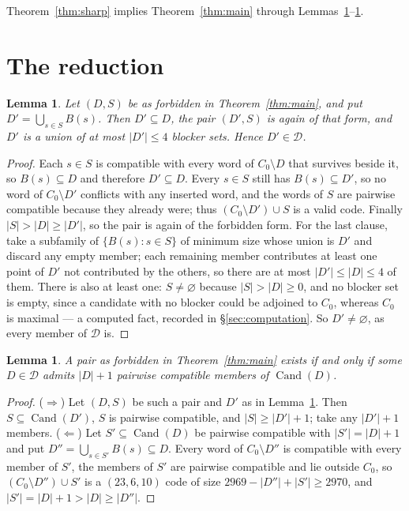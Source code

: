 \documentclass[11pt]{amsart}
\newtheorem{lemma}[theorem]{Lemma}
\theoremstyle{remark}
\DeclareMathOperator{\Cand}{Cand}
\begin{document}
Theorem~\ref{thm:sharp} implies Theorem~\ref{thm:main} through
Lemmas~\ref{lem:shrink}--\ref{lem:iff}.

\section{The reduction}\label{sec:reduction}

\begin{lemma}\label{lem:shrink}
Let $(D,S)$ be as forbidden in Theorem~\ref{thm:main}, and put
$D'=\bigcup_{s\in S}B(s)$. Then $D'\subseteq D$, the pair $(D',S)$ is again of that form, and
$D'$ is a union of at most $|D'|\le 4$ blocker sets. Hence $D'\in\mathcal D$.
\end{lemma}

\begin{proof}
Each $s\in S$ is compatible with every word of $C_0\setminus D$ that survives beside it, so
$B(s)\subseteq D$ and therefore $D'\subseteq D$. Every $s\in S$ still has $B(s)\subseteq D'$,
so no word of $C_0\setminus D'$ conflicts with any inserted word, and the words of $S$ are
pairwise compatible because they already were; thus $(C_0\setminus D')\cup S$ is a valid code.
Finally $|S|>|D|\ge|D'|$, so the pair is again of the forbidden form. For the last clause,
take a subfamily of $\{B(s):s\in S\}$ of minimum size whose union is $D'$ and discard any
empty member; each remaining member contributes at least one point of $D'$ not contributed by
the others, so there are at most $|D'|\le|D|\le4$ of them. There is also at least one: $S\ne\varnothing$
because $|S|>|D|\ge0$, and no blocker set is empty, since a candidate with no blocker could be
adjoined to $C_0$, whereas $C_0$ is maximal --- a computed fact, recorded in
\S\ref{sec:computation}. So $D'\ne\varnothing$, as every member of $\mathcal D$ is.
\end{proof}

\begin{lemma}\label{lem:iff}
A pair as forbidden in Theorem~\ref{thm:main} exists if and only if some $D\in\mathcal D$
admits $|D|+1$ pairwise compatible members of $\Cand(D)$.
\end{lemma}

\begin{proof}
($\Rightarrow$) Let $(D,S)$ be such a pair and $D'$ as in Lemma~\ref{lem:shrink}. Then
$S\subseteq\Cand(D')$, $S$ is pairwise compatible, and $|S|\ge|D'|+1$; take any $|D'|+1$
members. ($\Leftarrow$) Let $S'\subseteq\Cand(D)$ be pairwise compatible with
$|S'|=|D|+1$ and put $D''=\bigcup_{s\in S'}B(s)\subseteq D$. Every word of
$C_0\setminus D''$ is compatible with every member of $S'$, the members of $S'$ are pairwise
compatible and lie outside $C_0$, so $(C_0\setminus D'')\cup S'$ is a $(23,6,10)$ code of size
$2969-|D''|+|S'|\ge 2970$, and $|S'|=|D|+1>|D|\ge|D''|$.
\end{proof}
\end{document}
